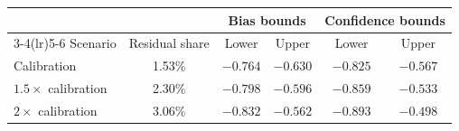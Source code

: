 \begin{tabular}{lccccc}
\toprule
 & & \multicolumn{2}{c}{Bias bounds} & \multicolumn{2}{c}{Confidence bounds}\\
\cmidrule(lr){3-4}\cmidrule(lr){5-6}
Scenario & Residual share & Lower & Upper & Lower & Upper\\
\midrule
Calibration & 1.53\% & $-0.764$ & $-0.630$ & $-0.825$ & $-0.567$\\
$1.5\times$ calibration & 2.30\% & $-0.798$ & $-0.596$ & $-0.859$ & $-0.533$\\
$2\times$ calibration & 3.06\% & $-0.832$ & $-0.562$ & $-0.893$ & $-0.498$\\
\bottomrule
\end{tabular}
